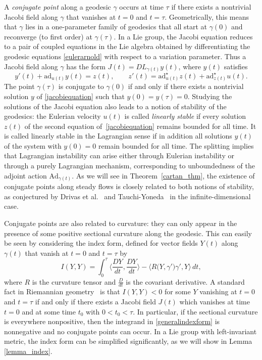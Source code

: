 \documentclass[oneside, 11pt]{amsart}
\numberwithin{equation}{section}
\newcommand{\ad}{\mathrm{ad}}
\newcommand{\Ad}{\mathrm{Ad}}
\newcommand{\adstar}{\ad^{\star}}
\begin{document}
A \emph{conjugate point} along a geodesic $\gamma$ occurs at time $\tau$ if there exists a nontrivial Jacobi field along $\gamma$ that vanishes at $t=0$ and $t=\tau$. Geometrically, this means that $\gamma$ lies in a one-parameter family of geodesics that all start at $\gamma(0)$ and reconverge (to first order) at $\gamma(\tau)$. In a Lie group, the Jacobi equation reduces to a pair of coupled equations in the Lie algebra obtained by differentiating the geodesic equations \ref{eulerarnold} with respect to a variation parameter. Thus a Jacobi field along $\gamma$ has the form $J(t) = DL_{\gamma(t)}y(t)$, where $y(t)$ satisfies
\begin{equation}\label{jacobiequation}
y'(t) + \ad_{u(t)}y(t) = z(t), \qquad
z'(t) = \adstar_{u(t)}z(t) + \adstar_{z(t)}u(t).
\end{equation}  
The point $\gamma(\tau)$ is conjugate to $\gamma(0)$ if and only if there exists a nontrivial solution $y$ of \eqref{jacobiequation} such that $y(0) = y(\tau) = 0$. Studying the solutions of the Jacobi equation also leads to a notion of stability of the geodesics: the Eulerian velocity $u(t)$ is called \emph{linearly stable} if every solution $z(t)$ of the second equation of~\eqref{jacobiequation}
remains bounded for all time. It is called linearly stable in the Lagrangian sense if in addition all solutions $y(t)$ of the system with $y(0)=0$ remain bounded for all time. The splitting implies that Lagrangian instability can arise either through Eulerian instability or through a purely Lagrangian mechanism, corresponding to unboundedness of the adjoint action $\Ad_{\gamma(t)}$. As we will see in Theorem~\ref{cartan_thm}, the existence of conjugate points along steady flows is closely related to both notions of stability, as conjectured by Drivas et al.~\cite{DMSY} and Tauchi-Yoneda~\cite{TauchiYoneda} in the infinite-dimensional case.

Conjugate points are also related to curvature: they can only appear in the presence of some positive sectional curvature along the geodesic. This can easily be seen by considering the index form, defined for vector fields $Y(t)$ along $\gamma(t)$ that vanish at $t=0$ and $t=\tau$ by 
\begin{equation}\label{generalindexform}
I(Y,Y) = \int_0^\tau \Big\langle \frac{DY}{dt}, \frac{DY}{dt}\Big\rangle - \big\langle R\big(Y, \gamma'\big)\gamma', Y\big\rangle \, dt,
\end{equation}
where $R$ is the curvature tensor and $\frac{D}{dt}$ is the covariant derivative. A standard fact in Riemannian geometry~\cite{doCarmo} is that $I(Y, Y) < 0$ for some $Y$ vanishing at $t = 0$ and $t = \tau$ if and only if there exists a Jacobi field $J(t)$ which vanishes at time $t=0$ and at some time $t_0$ with $0<t_0<\tau$. In particular, if the sectional curvature is everywhere nonpositive, then the integrand in \eqref{generalindexform} is nonnegative and no conjugate points can occur. In a Lie group with left-invariant metric, the index form can be simplified significantly, as we will show in Lemma \ref{lemma_index}. 
\end{document}
